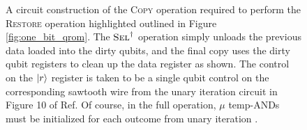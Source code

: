\documentclass[a4paper, amsfonts, amssymb, amsmath, reprint, showkeys, twoside,superscriptaddress, onecolumn, nofootinbib]{revtex4-2}
\begin{document}
\begin{figure}[htbp!]
    \centering
    \caption{A circuit construction of the \textsc{Copy} operation required to perform the \textsc{Restore} operation highlighted outlined in Figure \ref{fig:one_bit_qrom}. The $\textsc{Sel}^\dagger$ operation simply unloads the previous data loaded into the dirty qubits, and the final copy uses the dirty qubit registers to clean up the data register as shown. The control on the $\ket r$ register is taken to be a single qubit control on the corresponding sawtooth wire from the unary iteration circuit in Figure 10 of Ref. Of course, in the full operation, $\mu$ temp-ANDs must be initialized for each outcome from unary iteration \cite{babbush2018encoding}.}
    \label{fig:restore}
\end{figure}
\end{document}
